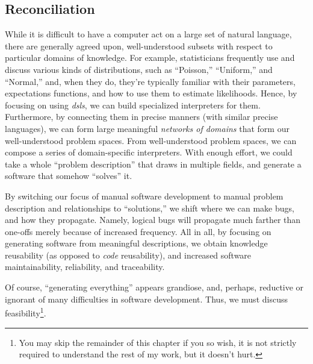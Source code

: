 \subsection{Reconciliation}
\label{chap:ideology:sec:thoughts_of_generation:subsec:reconciliation}

While it is difficult to have a computer act on a large set of natural language,
there are generally agreed upon, well-understood subsets \cite{well-understood}
with respect to particular domains of knowledge. For example, statisticians
frequently use and discuss various kinds of distributions, such as ``Poisson,''
``Uniform,'' and ``Normal,'' and, when they do, they're typically familiar with
their parameters, expectations functions, and how to use them to estimate
likelihoods. Hence, by focusing on using \textit{\aclp{dsl}}, we can build
specialized interpreters for them. Furthermore, by connecting them in precise
manners (with similar precise languages), we can form large meaningful
\textit{networks of domains} \cite{Czarnecki2005} that form our well-understood
problem spaces. From well-understood problem spaces, we can compose a series of
domain-specific interpreters. With enough effort, we could take a whole
``problem description'' that draws in multiple fields, and generate a software
that somehow ``solves'' it. 




By switching our focus of manual software development to manual problem
description and relationships to ``solutions,'' we shift where we can make bugs,
and how they propagate. Namely, logical bugs will propagate much farther than
one-offs merely because of increased frequency. All in all, by focusing on
generating software from meaningful descriptions, we obtain knowledge
reusability (as opposed to \textit{code} reusability), and increased software
maintainability, reliability, and traceability.

Of course, ``generating everything'' appears grandiose, and, perhaps, reductive
or ignorant of many difficulties in software development. Thus, we must discuss
feasibility\footnote{You may skip the remainder of this chapter if you so wish,
it is not strictly required to understand the rest of my work, but it doesn't
hurt.}.


